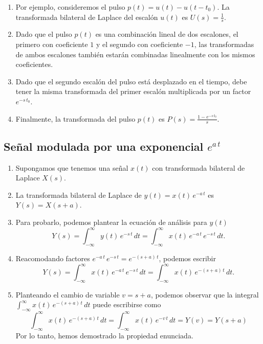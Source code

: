 \begin{enumerate}

\item Por ejemplo, consideremos el pulso $p(t) = u(t) - u(t - t_{0})$. La transformada bilateral de Laplace del escal\'{o}n $u(t)$ es $U(s) = \frac{1}{s}$.

\item Dado que el pulso $p(t)$ es una combinaci\'{o}n lineal de dos escalones, el primero con coeficiente $1$ y el segundo con coeficiente $-1$, las transformadas de ambos escalones tambi\'{e}n estar\'{a}n combinadas linealmente con los mismos coeficientes.

\item Dado que el segundo escal\'{o}n del pulso est\'{a} desplazado en el tiempo, debe tener la misma transformada del primer escal\'{o}n multiplicada por un factor $e^{-s \, t_{0}}$.

\item Finalmente, la transformada del pulso $p(t)$ es $P(s) = \frac{1 - e^{-s \, t_{0}}}{s}$.

\end{enumerate}

\subsection{Se\~{n}al modulada por una exponencial $e^{a \, t}$}

\begin{enumerate}
\item Supongamos que tenemos una se\~{n}al $x(t)$ con transformada bilateral de Laplace $X(s)$. 

\item La transformada bilateral de Laplace de $y(t) = x(t) \, e^{-a \, t}$ es $Y(s) = X(s + a)$.

\item Para probarlo, podemos plantear la ecuaci\'{o}n de an\'{a}lisis para $y(t)$
\begin{equation}
  Y(s) = \int_{-\infty}^{\infty} y(t) \, e^{-s \, t} \, dt = \int_{-\infty}^{\infty} x(t) \, e^{-a \, t} \, e^{-s \, t} \, dt.
\end{equation}

\item Reacomodando factores $e^{-a \, t} \, e^{-s \, t} = e^{-(s + a)\, t}$, podemos escribir
\begin{equation}
  Y(s) = \int_{-\infty}^{\infty} x(t) \, e^{-a \, t} \, e^{-s \, t} \, dt = \int_{-\infty}^{\infty} x(t) \, e^{-(s + a) \, t} \, dt.
\end{equation}

\item Planteando el cambio de variable $v = s + a$, podemos observar que la integral $\int_{-\infty}^{\infty} x(t) \, e^{-(s + a) \, t} \, dt$
puede escribirse como
\begin{equation}
\int_{-\infty}^{\infty} x(t) \, e^{-(s + a) \, t} \, dt  = \int_{-\infty}^{\infty} x(t) \, e^{-v \, t} \, dt = Y(v) = Y(s + a)
\end{equation}
Por lo tanto, hemos demostrado la propiedad enunciada.
\end{enumerate}


